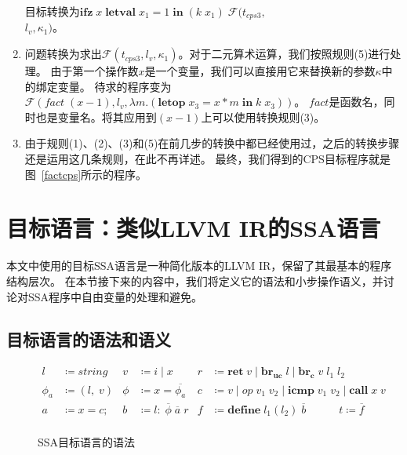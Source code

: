 \begin{enumerate}
        目标转换为$\mathbf{ifz}\; x\; \mathbf{letval}\; x_1 = 1\; \mathbf{in}\; (k\; x_1)\; \mathbf{\mathcal{F}}(t_{cps3}, $ \\ $l_v, \kappa_1)$。
    \item 问题转换为求出$\mathbf{\mathcal{F}}(t_{cps3}, l_v, \kappa_1)$。对于二元算术运算，我们按照规则(5)进行处理。
        由于第一个操作数$x$是一个变量，我们可以直接用它来替换新的参数$\kappa$中的绑定变量。
        待求的程序变为$\mathbf{\mathcal{F}}(fact\; (x-1), l_v, \lambda m. (\mathbf{letop}\; x_3=x*m\; \mathbf{in}\; k\; x_3))$。
        $fact$是函数名，同时也是变量名。将其应用到$(x-1)$上可以使用转换规则(3)。
    \item 由于规则(1)、(2)、(3)和(5)在前几步的转换中都已经使用过，之后的转换步骤还是运用这几条规则，在此不再详述。
        最终，我们得到的CPS目标程序就是图~\ref{factcps}所示的程序。
\end{enumerate}

\section{目标语言：类似LLVM IR的SSA语言}

本文中使用的目标SSA语言是一种简化版本的LLVM IR，保留了其最基本的程序结构层次。
在本节接下来的内容中，我们将定义它的语法和小步操作语义，并讨论对SSA程序中自由变量的处理和避免。

\subsection{目标语言的语法和语义}

\begin{figure}[htbp]
    \centering
    \begin{equation}
        \nonumber
        \begin{aligned}
            l &\coloneqq string & v &\coloneqq i\; |\; x & r &\coloneqq \mathbf{ret}\; v\; |\; \mathbf{br_{uc}}\; l\; |\; \mathbf{br_c}\; v\; l_1\; l_2 \\
            \phi_a &\coloneqq (l,\; v) & \phi &\coloneqq x = \overline{\phi_a} &  c &\coloneqq v\; |\; op\; v_1\; v_2\; |\; \mathbf{icmp}\; v_1\; v_2\; |\; \mathbf{call}\; x\; v \\
            a &\coloneqq x = c; & b &\coloneqq l:\; \overline{\phi}\; \overline{a}\; r & f &\coloneqq \mathbf{define}\; l_1(l_2)\; \overline{b} \quad\quad\quad t \coloneqq \overline{f} \\
        \end{aligned}
    \end{equation}
    \caption{SSA目标语言的语法}\label{synssa}
\end{figure}

